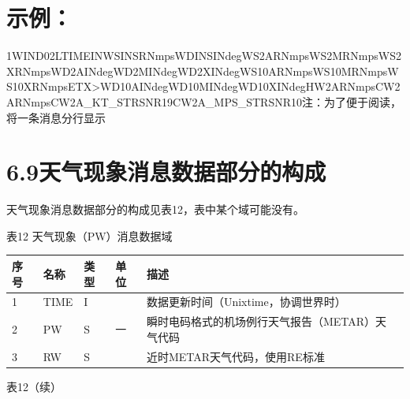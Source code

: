 \documentclass[
  10
]{article}
\begin{document}
\section{示例：}\label{ux793aux4f8b-5}

1\textbar\textbar WIND\textbar02LTIME\textbar I\textbar N\textbar WSINS\textbar R\textbar N\textbar mpsWDINS\textbar I\textbar N\textbar degWS2A\textbar R\textbar N\textbar mpsWS2M\textbar R\textbar N\textbar mpsWS2X\textbar R\textbar N\textbar mpsWD2A\textbar I\textbar N\textbar degWD2M\textbar I\textbar N\textbar degWD2X\textbar I\textbar N\textbar degWS10A\textbar R\textbar N\textbar mpsWS10M\textbar R\textbar N\textbar mpsWS10X\textbar R\textbar N\textbar mpsETX\textgreater WD10A\textbar I\textbar N\textbar degWD10M\textbar I\textbar N\textbar degWD10X\textbar I\textbar N\textbar degHW2A\textbar R\textbar N\textbar mpsCW2A\textbar R\textbar N\textbar mpsCW2A\_KT\_STR\textbar S\textbar N\textbar R19\textbar CW2A\_MPS\_STR\textbar S\textbar N\textbar R10\textbar 注：为了便于阅读，将一条消息分行显示

\section{6.9天气现象消息数据部分的构成}\label{ux5929ux6c14ux73b0ux8c61ux6d88ux606fux6570ux636eux90e8ux5206ux7684ux6784ux6210}

天气现象消息数据部分的构成见表12，表中某个域可能没有。

表12 天气现象（PW）消息数据域

\begin{longtable}[]{@{}|l|l|l|l|l|l|@{}}
\toprule\noalign{}
\endhead
\bottomrule\noalign{}
\endlastfoot
\hline
序号 & 名称 & 类型 & 单位 & 描述 & \\
\hline
1 & TIME & I & & 数据更新时间（Unixtime，协调世界时） & \\
\hline
2 & PW & S & 一 & 瞬时电码格式的机场例行天气报告（METAR）天气代码 & \\
\hline
3 & RW & S & & 近时METAR天气代码，使用RE标准 & \\
\hline
\end{longtable}

表12（续）
\end{document}
